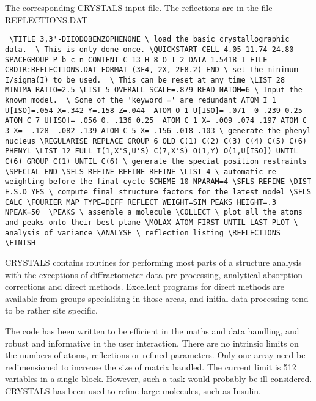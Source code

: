 \documentclass[10pt,a4paper]{report}
\begin{document}
\bigskip{}

The corresponding CRYSTALS input file. The reflections are in the file REFLECTIONS.DAT\small\begin{verbatim} \TITLE 3,3'-DIIODOBENZOPHENONE \ load the basic crystallographic data.  \ This is only done once. \QUICKSTART CELL 4.05 11.74 24.80 SPACEGROUP P b c n CONTENT C 13 H 8 O I 2 DATA 1.5418 I FILE CRDIR:REFLECTIONS.DAT FORMAT (3F4, 2X, 2F8.2) END \ set the minimum I/sigma(I) to be used.  \ This can be reset at any time \LIST 28 MINIMA RATIO=2.5 \LIST 5 OVERALL SCALE=.879 READ NATOM=6 \ Input the known model.  \ Some of the 'keyword =' are redundant ATOM I 1 U[ISO]=.054 X=.342 Y=.158 Z=.044  ATOM O 1 U[ISO]= .071  0 .239 0.25  ATOM C 7 U[ISO]= .056 0. .136 0.25  ATOM C 1 X= .009 .074 .197 ATOM C 3 X= -.128 -.082 .139 ATOM C 5 X= .156 .018 .103 \ generate the phenyl nucleus \REGULARISE REPLACE GROUP 6 OLD C(1) C(2) C(3) C(4) C(5) C(6) PHENYL \LIST 12 FULL I(1,X'S,U'S) C(7,X'S) O(1,Y) O(1,U[ISO]) UNTIL C(6) GROUP C(1) UNTIL C(6) \ generate the special position restraints \SPECIAL END \SFLS REFINE REFINE REFINE \LIST 4 \ automatic re-weighting before the final cycle SCHEME 10 NPARAM=4 \SFLS REFINE \DIST E.S.D YES \ compute final structure factors for the latest model \SFLS CALC \FOURIER MAP TYPE=DIFF REFLECT WEIGHT=SIM PEAKS HEIGHT=.3 NPEAK=50  \PEAKS \ assemble a molecule \COLLECT \ plot all the atoms and peaks onto their best plane \MOLAX ATOM FIRST UNTIL LAST PLOT \ analysis of variance \ANALYSE \ reflection listing \REFLECTIONS \FINISH\end{verbatim}\normalsize



\bigskip{}





CRYSTALS contains routines for performing most parts of a structure analysis with the exceptions of diffractometer data pre-processing, analytical  absorption corrections and direct methods. Excellent programs for direct methods are available from  groups specialising in those areas, and initial data processing tend to be rather site specific. 

The code has been written to be efficient in the maths and data handling, and robust and informative in the user interaction. There are no intrinsic limits on the numbers of atoms, reflections or refined parameters.  Only one array need be redimensioned to increase the size of matrix handled. The current limit is 512 variables in a single block. However, such a task would probably be ill-considered. CRYSTALS has been used to refine large molecules, such as Insulin.
\end{document}
